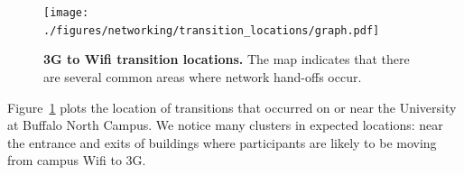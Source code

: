\begin{figure}[t]

\centering
\texttt{[image: ./figures/networking/transition\_locations/graph.pdf]}

\caption{\textbf{3G to Wifi transition locations.} The map indicates that
there are several common areas where network hand-offs occur.}

\label{figure-networktransitions}

\vspace*{-0.1in}

\end{figure}

Figure~\ref{figure-networktransitions} plots the location of transitions that
occurred on or near the University at Buffalo North Campus. We notice many
clusters in expected locations: near the entrance and exits of buildings
where participants are likely to be moving from campus Wifi to 3G.
